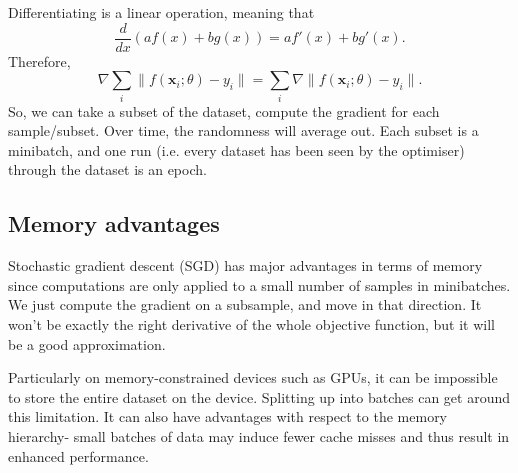 \documentclass[a4paper, openany]{memoir}
\begin{document}
Differentiating is a linear operation, meaning that
\[\frac{d}{dx}(a f(x) + bg(x)) = af'(x) + bg'(x).\]
Therefore,
\[\nabla \sum_i \lVert f(\mathbf{x}_i; \theta) - y_i \rVert = \sum_i \nabla \lVert f(\mathbf{x}_i; \theta) - y_i \rVert.\]
So, we can take a subset of the dataset, compute the gradient for each sample/subset. Over time, the randomness will average out. Each subset is a minibatch, and one run (i.e. every dataset has been seen by the optimiser) through the dataset is an epoch.

\subsection{Memory advantages}
Stochastic gradient descent (SGD) has major advantages in terms of memory since computations are only applied to a small number of samples in minibatches. We just compute the gradient on a subsample, and move in that direction. It won't be exactly the right derivative of the whole objective function, but it will be a good approximation.

Particularly on memory-constrained devices such as GPUs, it can be impossible to store the entire dataset on the device. Splitting up into batches can get around this limitation. It can also have advantages with respect to the memory hierarchy- small batches of data may induce fewer cache misses and thus result in enhanced performance.


\end{document}
